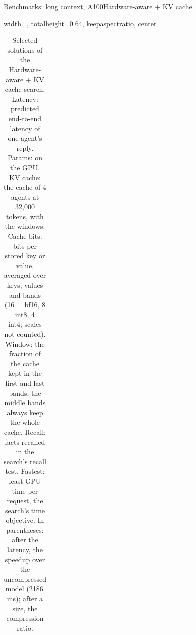 \documentclass[aspectratio=169,10pt]{beamer}
\begin{document}
\begin{frame}{Benchmarks: long context, A100}{Hardware-aware + KV cache}
\begin{table}
\begin{adjustbox}{width=\linewidth, totalheight=0.64\textheight, keepaspectratio, center}
\begin{tabular}{lcccccccc}
\bottomrule
\end{tabular}
\end{adjustbox}
\caption{Selected solutions of the Hardware-aware + KV cache search. Latency: predicted end-to-end latency of one agent's reply. Params: on the GPU. KV cache: the cache of 4 agents at 32{,}000 tokens, with the windows. Cache bits: bits per stored key or value, averaged over keys, values and bands (16 = bf16, 8 = int8, 4 = int4; scales not counted). Window: the fraction of the cache kept in the first and last bands; the middle bands always keep the whole cache. Recall: facts recalled in the search's recall test. Fastest: least GPU time per request, the search's time objective. In parentheses: after the latency, the speedup over the uncompressed model (2186\,ms); after a size, the compression ratio.}\label{tab:kvmodels}
\end{table}
\end{frame}
\end{document}
